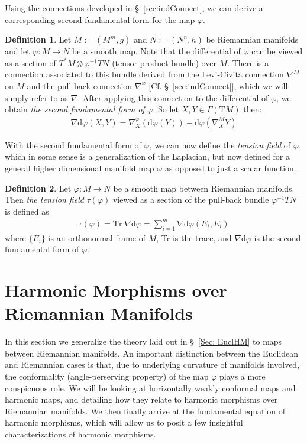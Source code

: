 \documentclass[12pt]{article}
\newcommand{\Dd}{\nabla \text{d}}
\newcommand{\diff}{\text{d}}
\theoremstyle{definition}
\newtheorem{definition}{Definition}[section]
\numberwithin{equation}{subsection}
\begin{document}
Using the connections developed in \S~\ref{sec:indConnect}, we can derive a corresponding second fundamental form for the map $\varphi$.

\begin{definition}
Let $M := (M^m, g)$ and $N := (N^n, h)$ be Riemannian manifolds and let $\varphi:M \rightarrow N$ be a smooth map. Note that the differential of $\varphi$ can be viewed as a section of $T^*M \otimes \varphi^{-1}TN$ (tensor product bundle) over $M$. There is a connection associated to this bundle derived from the Levi-Civita connection $\nabla^M$ on $M$ and the pull-back connection $\nabla^\varphi$ [Cf. \S~\ref{sec:indConnect}], which we will simply refer to as $\nabla$. After applying this connection to the differential of $\varphi$, we obtain \textit{the second fundamental form of} $\varphi$. So let $X, Y \in \Gamma(\text{T}M)$ then:
\begin{align}
    \nabla \diff \varphi (X, Y) = \nabla_X^\varphi(\diff \varphi(Y)) - \diff \varphi(\nabla_X^M Y)
\end{align}
\end{definition}

With the second fundamental form of $\varphi$, we can now define the \textit{tension field} of $\varphi$, which in some sense is a generalization of the Laplacian, but now defined for a general higher dimensional manifold map $\varphi$ as opposed to just a scalar function. 

\begin{definition}
Let $\varphi: M \rightarrow N$ be a smooth map between Riemannian manifolds. Then \textit{the tension field} $\tau(\varphi)$ viewed as a section of the pull-back bundle $\varphi^{-1}TN$ is defined as
\begin{align}
    \tau(\varphi) = \text{Tr} \;\Dd \varphi = \sum_{i=1}^m \Dd \varphi(E_i, E_i)
\end{align}
where $\{E_i\}$ is an orthonormal frame of $M$, Tr is the trace, and $\Dd \varphi$ is the second fundamental form of $\varphi$.
\end{definition}


\section{Harmonic Morphisms over Riemannian Manifolds}
In this section we generalize the theory laid out in \S~\ref{Sec: EuclHM} to maps between Riemannian manifolds. An important distinction between the Euclidean and Riemannian cases is that, due to underlying curvature of manifolds involved, the conformality (angle-perserving property) of the map $\varphi$ plays a more conspicuous role.
We will be looking at horizontally weakly conformal maps and harmonic maps, and detailing how they relate to harmonic morphisms over Riemannian manifolds. We then finally arrive at the fundamental equation of harmonic morphisms, which will allow us to posit a few insightful characterizations of harmonic morphisms.
\end{document}
